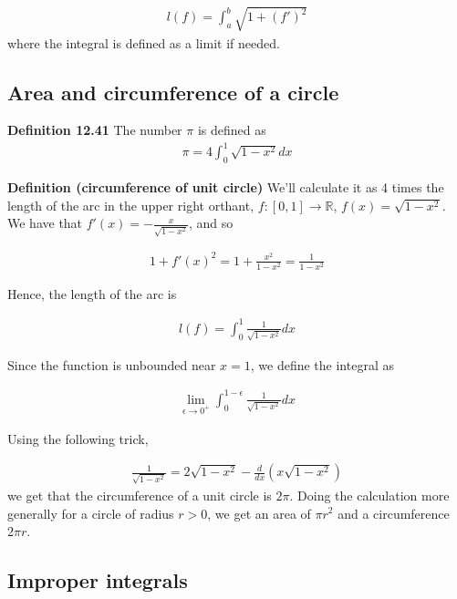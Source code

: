 \documentclass[11pt]{article}
\begin{document}
\begin{align*}
    l(f) = \int_a^b \sqrt{1+(f')^2}
\end{align*}
where the integral is defined as a limit if needed. 

\newpage

\begin{center}
\section*{Area and circumference of a circle}
\end{center}

\textbf{Definition 12.41} The number $\pi$ is defined as
\begin{align*}
    \pi = 4 \int_0^1 \sqrt{1 - x^2}dx
\end{align*}

\textbf{Definition (circumference of unit circle)} We'll calculate it as 4 times the length of the arc in the upper right orthant, $f: [0,1] \to \mathbb{R}$, $f(x) = \sqrt{1 - x^2}$. We have that $f'(x) = -\frac{x}{\sqrt{1-x^2}}$, and so 

\begin{align*}
    1 + f'(x)^2 = 1 + \frac{x^2}{1-x^2} = \frac{1}{1-x^2}
\end{align*}

Hence, the length of the arc is 

\begin{align*}
    l(f) = \int_0^1 \frac{1}{\sqrt{1-x^2}}dx
\end{align*}

Since the function is unbounded near $x=1$, we define the integral as 

\begin{align*}
    \lim_{\epsilon \to 0^+} \int_0^{1- \epsilon} \frac{1}{\sqrt{1-x^2}}dx
\end{align*}

Using the following trick, 

\begin{align*}
    \frac{1}{\sqrt{1-x^2}} = 2\sqrt{1-x^2} - \frac{d}{dx}(x \sqrt{1-x^2})
\end{align*}
we get that the circumference of a unit circle is $2 \pi$. Doing the calculation more generally for a circle of radius $r > 0$, we get an area of $\pi r^2$ and a circumference $ 2 \pi r$. 

\newpage

\begin{center}
    \section*{Improper integrals}
\end{center}
\end{document}
